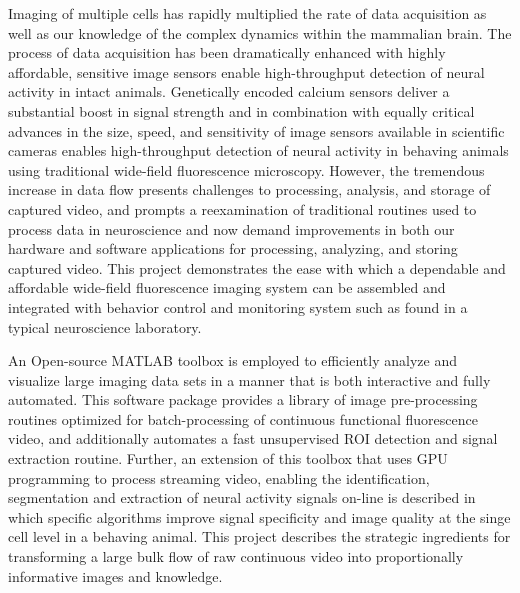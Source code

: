 
Imaging of multiple cells has rapidly multiplied the rate of data acquisition as well as our knowledge of the complex dynamics within the mammalian brain.
The process of data acquisition has been dramatically enhanced with highly affordable, sensitive image sensors enable high-throughput detection of neural activity in intact animals.
Genetically encoded calcium sensors deliver a substantial boost in signal strength and in combination with equally critical advances in the size, speed, and sensitivity of image sensors available in scientific cameras enables high-throughput detection of neural activity in behaving animals using traditional wide-field fluorescence microscopy.
However, the tremendous increase in data flow presents challenges to processing, analysis, and storage of captured video, and prompts a reexamination of traditional routines used to process data in neuroscience and now demand improvements in both our hardware and software applications for processing, analyzing, and storing captured video.
This project demonstrates the ease with which a dependable and affordable wide-field fluorescence imaging system can be assembled and integrated with behavior control and monitoring system such as found in a typical neuroscience laboratory.

An Open-source MATLAB toolbox is employed to efficiently analyze and visualize large imaging data sets in a manner that is both interactive and fully automated.
This software package provides a library of image pre-processing routines optimized for batch-processing of continuous functional fluorescence video, and additionally automates a fast unsupervised ROI detection and signal extraction routine.
Further, an extension of this toolbox that uses GPU programming to process streaming video, enabling the identification, segmentation and extraction of neural activity signals on-line is described in which specific algorithms improve signal specificity and image quality at the singe cell level in a behaving animal.
This  project describes the strategic ingredients for transforming a large bulk flow of raw continuous video into proportionally informative images and knowledge.


